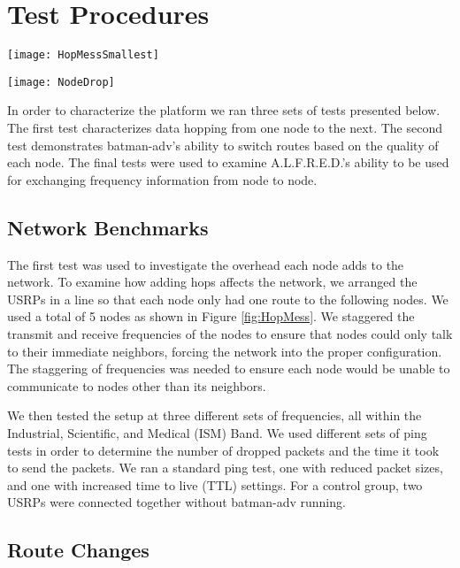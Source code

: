 \section{Test Procedures}

\begin{figure*}
	\centering
	\texttt{[image: HopMessSmallest]}
	\caption{The configuration used for the first set of tests.}
	\label{fig:HopMess}
\end{figure*}

\begin{figure*}
	\centering
	\texttt{[image: NodeDrop]}
	\caption{The configuration used for the second set of tests.}
	\label{fig:NodeDrop}
\end{figure*}

In order to characterize the platform we ran three sets of tests presented below. The first test characterizes data hopping from one node to the next. The second test demonstrates batman-adv's ability to switch routes based on the quality of each node. The final tests were used to examine A.L.F.R.E.D.'s ability to be used for exchanging frequency information from node to node. 

\subsection{Network Benchmarks}

The first test was used to investigate the overhead each node adds to the network. To examine how adding hops affects the network, we arranged the USRPs in a line so that each node only had one route to the following nodes.  We used a total of 5 nodes as shown in Figure \ref{fig:HopMess}. We staggered the transmit and receive frequencies of the nodes to ensure that nodes could only talk to their immediate neighbors, forcing the network into the proper configuration. The staggering of frequencies was needed to ensure each node would be unable to communicate to nodes other than its neighbors. 

 We then tested the setup at three different sets of frequencies, all within the Industrial, Scientific, and Medical (ISM) Band. We used different sets of ping tests in order to determine the number of dropped packets and the time it took to send the packets. We ran a standard ping test, one with reduced packet sizes, and one with increased time to live (TTL) settings. For a control group, two USRPs were connected together without batman-adv running. 


\subsection{Route Changes}

